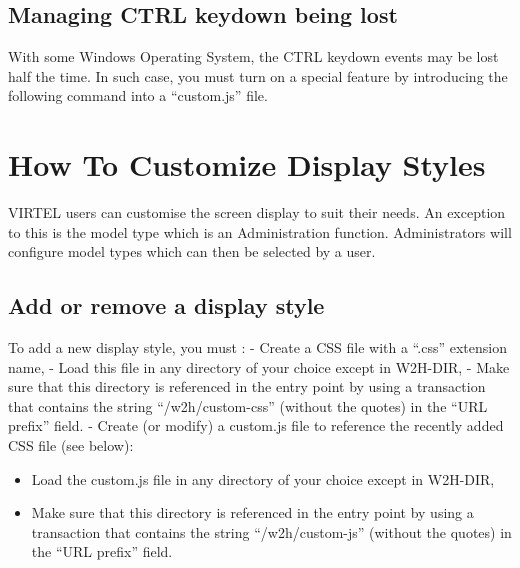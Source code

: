 \documentclass[letterpaper,10pt,english]{sphinxmanual}
\begin{document}
\subsection{Managing CTRL keydown being lost}
\label{\detokenize{User_Guide:managing-ctrl-keydown-being-lost}}
With some Windows Operating System, the CTRL keydown events may be lost half the time. In such case, you must
turn on a special feature by introducing the following command into a “custom.js” file.

\begin{sphinxVerbatim}[commandchars=\\\{\}]
            
        
      
  
\end{sphinxVerbatim}


\section{How To Customize Display Styles}
\label{\detokenize{User_Guide:v457ug-customize-display}}\label{\detokenize{User_Guide:how-to-customize-display-styles}}
VIRTEL users can customise the screen display to suit their needs. An exception to this is the model type which is an
Administration function. Administrators will configure model types which can then be selected by a user.


\subsection{Add or remove a display style}
\label{\detokenize{User_Guide:add-or-remove-a-display-style}}
To add a new display style, you must :
- Create a CSS file with a “.css” extension name,
- Load this file in any directory of your choice except in W2H-DIR,
- Make sure that this directory is referenced in the entry point by using a transaction that contains the string “/w2h/custom-css” (without the quotes) in the “URL prefix” field.
- Create (or modify) a custom.js file to reference the recently added CSS file (see below):
\begin{itemize}
\item {} 
Load the custom.js file in any directory of your choice except in W2H-DIR,

\item {} 
Make sure that this directory is referenced in the entry point by using a transaction that contains the string “/w2h/custom-js” (without the quotes) in the “URL prefix” field.

\end{itemize}
\end{document}
